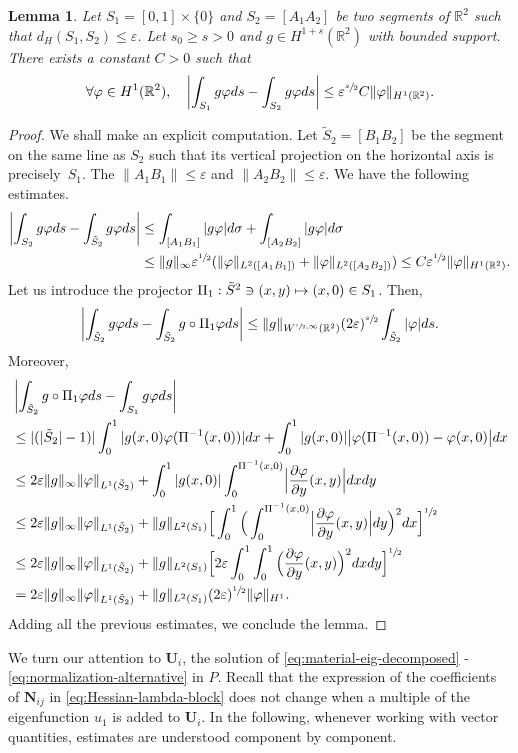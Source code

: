 \documentclass[11pt]{article}
\numberwithin{equation}{section}\newtheorem*{jepEnonce}{\jepEnonceTitle}\newenvironment{enonce*}[1]{\def\jepEnonceTitle{#1}\jepEnonce}{\endjepEnonce}\newtheorem*{conj*}{Conjecture}
\def\mto{\mathchoice{\longmapsto}{\mapsto}{\mapsto}{\mapsto}}
\theoremstyle{plain}
\newtheorem{lemma}[thm]{Lemma}
\theoremstyle{definition}
\newcommand{\bo}[1]{{\boldsymbol#1}}
\def\R{\mathbb{R}}
\newcommand{\vps}{\varepsilon}
\newcommand{\vphi}{\varphi}
\let\jepOriginalSfrac\sfrac
\renewcommand{\sfrac}[2]{{\jepOriginalSfrac{#1}{#2}}}
\begin{document}
\begin{lemma}
Let $S_1= [0,1]\times \{0\}$ and $S_2 = [A_1A_2]$ be two segments of $\R^2$ such that $d_H(S_1, S_2) \le \vps$.
Let $s_0\ge s >0$ and $g \in H^{1+s} (\R^2)$ with bounded support. There exists a constant $C>0$ such that
\[
\forall \vphi \in H^1(\R^2), \quad\left|\int_{S_1} g \vphi ds - \int_{S_2} g \vphi ds\right| \le \vps^{\sfrac s2} C \| \vphi \|_{H^1(\R^2)}.
\]
\end{lemma}
\begin{proof}
We shall make an explicit computation. Let $\tilde S_2= [B_1B_2]$ be the segment on the same line as $S_2$ such that its vertical projection on the horizontal axis is precisely~$S_1$. The $\|A_1B_1\| \le \vps$ and $\|A_2B_2\| \le \vps$.
We have the following estimates.
\begin{align*}
\left|\int_{S_2} g \vphi ds - \int_{\tilde S_2} g \vphi ds\right|&\le \int _{[A_1B_1]} |g \vphi |d \sigma + \int _{[A_2B_2]} |g \vphi |d \sigma
\\
&\le \|g \|_\infty \vps^{\sfrac 12}(\| \vphi \|_{L^2([A_1B_1])} + \| \vphi \|_{L^2([A_2B_2])}) \le C\vps^{\sfrac12} \| \vphi \|_{H^1(\R^2)}.
\end{align*}
Let us introduce the projector $\Pi_1: \tilde S^2 \ni (x,y) \mto (x,0)\in S_1$.
Then,
\[
\left|\int_{\tilde S_2} g \vphi ds -\int_{\tilde S_2} g\circ \Pi_1 \vphi ds\right|\le \|g\|_{W^{\sfrac s2, \infty} (\R^2)}(2\vps)^{\sfrac s2} \int _{\tilde S_2} | \vphi | ds.
\]
Moreover,
\begin{align*}&\left|\int_{\tilde S_2} g\circ \Pi_1 \vphi ds -\int_{ S_1} g \vphi ds\right|\\
&\le |(|\tilde S_2|-1)|\int_0^1 |g(x, 0) \vphi (\Pi^{-1} (x,0))| dx+ \int_0^1 |g(x, 0)| \big | \vphi (\Pi^{-1} (x,0))- \vphi (x,0) \big |dx\\
& \le 2 \vps \|g\|_\infty \| \vphi \|_{L^1(\tilde S_2)} + \int_0^1 |g(x, 0) | \int_0^{\Pi^{-1} (x,0)} \Bigl|\frac{\partial \vphi }{\partial y} (x,y)\Bigr|dxdy\\
& \le 2 \vps \|g\|_\infty \| \vphi \|_{L^1(\tilde S_2)} + \|g\|_{L^2(S_1)} \Big [\int_0^1 \Big (\int_0^{\Pi^{-1} (x,0)} \Bigl|\frac{\partial \vphi }{\partial y} (x,y)\Bigr| dy \Big)^2 dx \Big ]^{\sfrac 12}\\
&\le 2 \vps \|g\|_\infty \| \vphi \|_{L^1(\tilde S_2)} + \|g\|_{L^2(S_1)} \Big [ 2\vps \int_0^1 \int_0^1 \Big (\frac{\partial \vphi }{\partial y} (x,y)\Big)^2 dx dy\Big ]^{\sfrac 12}\\
&= 2 \vps \|g\|_\infty \| \vphi \|_{L^1(\tilde S_2)} + \|g\|_{L^2(S_1)} (2\vps)^{\sfrac 12} \| \vphi \|_{H^1}.
\end{align*}
Adding all the previous estimates, we conclude the lemma.
\end{proof}
We turn our attention to $\bo U_i$, the solution of \eqref{eq:material-eig-decomposed} - \eqref{eq:normalization-alternative} in $P$.
Recall that the expression of the coefficients of $\bo N_{ij}$ in \eqref{eq:Hessian-lambda-block} does not change when a multiple of the eigenfunction $u_1$ is added to $\bo U_i$. In the following, whenever working with vector quantities, estimates are understood component by component.
\end{document}
